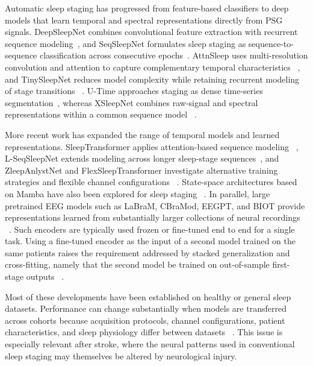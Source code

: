 \documentclass[a4paper,fleqn]{cas-sc}
\begin{document}
Automatic sleep staging has progressed from feature-based classifiers to deep
models that learn temporal and spectral representations directly from PSG
signals. DeepSleepNet combines convolutional feature extraction with recurrent sequence modeling~\cite{supratak2017deepsleepnet}, and SeqSleepNet formulates sleep staging as sequence-to-sequence classification across consecutive epochs~\cite{phan2019seqsleepnet}. AttnSleep uses multi-resolution convolution and
attention to capture complementary temporal characteristics
~\cite{eldele2021attnsleep}, and TinySleepNet reduces model complexity while
retaining recurrent modeling of stage transitions
~\cite{supratak2020tinysleepnet}. U-Time approaches staging as dense
time-series segmentation~\cite{perslev2019utime}, whereas XSleepNet combines
raw-signal and spectral representations within a common sequence model
~\cite{phan2021xsleepnet}.

More recent work has expanded the range of temporal models and learned
representations. SleepTransformer applies attention-based sequence modeling
~\cite{sleeptransformer2022}, L-SeqSleepNet extends modeling across longer
sleep-stage sequences~\cite{lseqsleepnet2023}, and ZleepAnlystNet and
FlexSleepTransformer investigate alternative training strategies and flexible
channel configurations
~\cite{jirakittayakorn2024zleep,guo2024flexsleep}. State-space architectures
based on Mamba have also been explored for sleep staging
~\cite{gu2023mamba,bitmamsleep2024}. In parallel, large pretrained EEG models
such as LaBraM, CBraMod, EEGPT, and BIOT provide representations learned from
substantially larger collections of neural recordings
~\cite{labram2024,cbramod2025,eegpt2024,biot2023}. Such encoders are typically
used frozen or fine-tuned end to end for a single task. Using a fine-tuned
encoder as the input of a second model trained on the same patients raises the
requirement addressed by stacked generalization and cross-fitting, namely that the
second model be trained on out-of-sample first-stage outputs
~\cite{wolpert1992stacked,chernozhukov2018dml}.

Most of these developments have been established on healthy or general sleep
datasets. Performance can change substantially when models are transferred
across cohorts because acquisition protocols, channel configurations, patient
characteristics, and sleep physiology differ between datasets
~\cite{guillot2023transfer}. This issue is especially relevant after stroke,
where the neural patterns used in conventional sleep staging may themselves be
altered by neurological injury.
\end{document}
